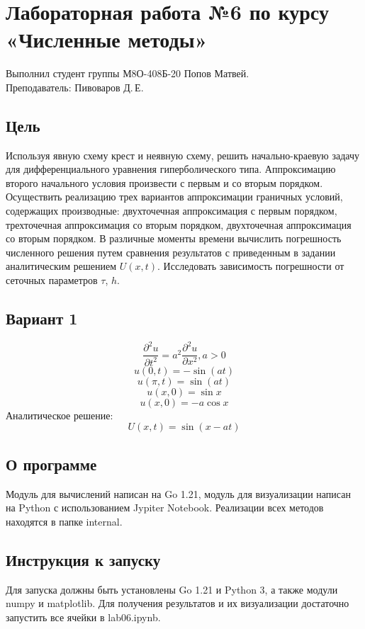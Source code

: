 \documentclass{article}
\begin{document}
\section*{Лабораторная работа №6 по курсу «Численные методы»}

Выполнил студент группы М8О-408Б-20 Попов Матвей.
\\
Преподаватель: Пивоваров Д.\,Е.

\subsection*{Цель}

Используя явную схему крест и неявную схему, решить начально-краевую задачу для 
дифференциального уравнения гиперболического типа. Аппроксимацию второго 
начального условия произвести с первым и со вторым порядком. Осуществить 
реализацию трех вариантов аппроксимации граничных условий, содержащих 
производные: двухточечная аппроксимация с первым порядком, трехточечная 
аппроксимация со вторым порядком, двухточечная аппроксимация со вторым 
порядком. В различные моменты времени вычислить погрешность численного решения 
путем сравнения результатов с приведенным в задании аналитическим решением 
$U(x, t)$. Исследовать зависимость погрешности от сеточных параметров $\tau$, 
$h$.

\subsection*{Вариант 1}
$$ \frac{\partial^2 u}{\partial t^2}=a^2 \frac{\partial^2u}{\partial x^2}, a > 0 $$
$$ u(0, t) = - \sin{(at)} $$
$$ u(\pi, t) = \sin{(at)} $$
$$ u(x, 0) = \sin{x} $$
$$ u(x, 0) = -a\cos{x} $$
Аналитическое решение: $$ U(x, t) = \sin{(x-at)} $$

\subsection*{О программе}
Модуль для вычислений написан на Go 1.21, модуль для визуализации написан 
на Python с использованием Jypiter Notebook. Реализации всех методов находятся 
в папке internal.

\subsection*{Инструкция к запуску}
Для запуска должны быть установлены Go 1.21 и Python 3, а также модули numpy и 
matplotlib. Для получения результатов и их визуализации достаточно запустить 
все ячейки в lab06.ipynb.
\end{document}
